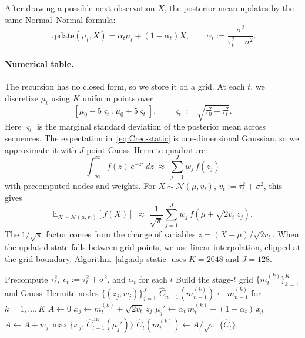 \documentclass[11pt]{article}
\begin{document}
After drawing a possible next observation \(X\), the posterior mean updates by the same Normal--Normal formula:
\[
\mathrm{update}(\mu_t,X)
=
\alpha_t\mu_t+(1-\alpha_t)X,
\qquad
\alpha_t:=\frac{\sigma^2}{\tau_t^2+\sigma^2}.
\]

\paragraph{Numerical table.}
The recursion has no closed form, so we store it on a grid. At each \(t\), we discretize \(\mu_t\) using \(K\) uniform points over
\[
[\mu_0-5\varsigma_t,\mu_0+5\varsigma_t],
\qquad
\varsigma_t:=\sqrt{\tau_0^2-\tau_t^2}.
\]
Here \(\varsigma_t\) is the marginal standard deviation of the posterior mean across sequences. The expectation in~\eqref{eq:Crec-static} is one-dimensional Gaussian, so we approximate it with \(J\)-point Gauss--Hermite quadrature:
\[
\int_{-\infty}^\infty f(z)\, e^{-z^2}\, dz \;\approx\; \sum_{j=1}^J w_j\, f(z_j)
\]
with precomputed nodes and weights. For \(X\sim\mathcal{N}(\mu,v_t)\), \(v_t:=\tau_t^2+\sigma^2\), this gives
\begin{equation}
\label{eq:gh}
\mathbb{E}_{X \sim \mathcal{N}(\mu, v_t)}[f(X)] \;\approx\; \frac{1}{\sqrt\pi}\sum_{j=1}^J w_j\, f\!\left(\mu + \sqrt{2 v_t}\, z_j\right).
\end{equation}
The \(1/\sqrt{\pi}\) factor comes from the change of variables \(z=(X-\mu)/\sqrt{2v_t}\). When the updated state falls between grid points, we use linear interpolation, clipped at the grid boundary. Algorithm~\ref{alg:adp-static} uses \(K=2048\) and \(J=128\).

\begin{algorithm}[H]
\caption{Numerical DP for the static-variance Bayes-optimal threshold (per regime).}
\label{alg:adp-static}
\begin{algorithmic}[1]
\State Precompute $\tau_t^2$, $v_t := \tau_t^2 + \sigma^2$, and $\alpha_t$ for each $t$
\State Build the stage-$t$ grid $\{m_t^{(k)}\}_{k=1}^K$ and Gauss--Hermite nodes $\{(z_j, w_j)\}_{j=1}^J$
\State $\widehat C_{n-1}(m_{n-1}^{(k)}) \gets m_{n-1}^{(k)}$ for $k = 1, \ldots, K$
    \State $A \gets 0$
      \State $x_j \gets m_t^{(k)} + \sqrt{2 v_t}\, z_j$
      \State $\mu_j' \gets \alpha_t\, m_t^{(k)} + (1-\alpha_t)\, x_j$
      \State $A \gets A + w_j\, \max\!\big\{x_j,\, \widehat C_{t+1}^{\mathrm{lin}}(\mu_j')\big\}$
    \EndFor
    \State $\widehat C_t(m_t^{(k)}) \gets A/\sqrt\pi$
  \EndFor
\EndFor
\State \Return $\{\widehat C_t\}$
\end{algorithmic}
\end{algorithm}
\end{document}
